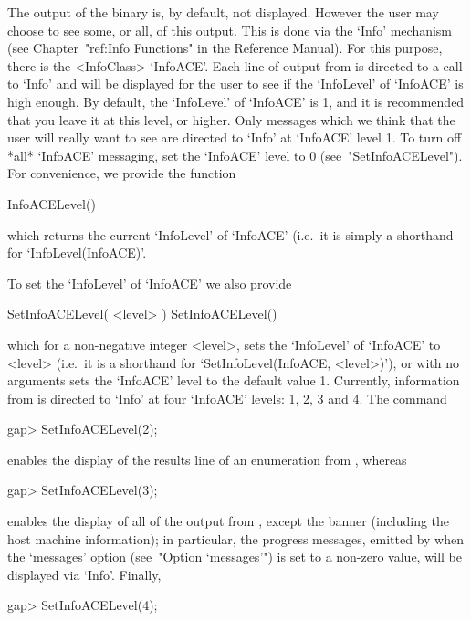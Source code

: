 
\beginitems

The output of the {\ACE} binary is, by default, not displayed. However
the user may choose to see some, or all, of this output. This is  done
via the `Info' mechanism  (see  Chapter~"ref:Info  Functions"  in  the
{\GAP} Reference Manual). For this purpose, there is  the  <InfoClass>
`InfoACE'. Each line of output from {\ACE} is directed to  a  call  to
`Info' and will be displayed for the user to see if the `InfoLevel' of
`InfoACE' is high enough. By default, the `InfoLevel' of `InfoACE'  is
1, and it is recommended that you leave it at this level,  or  higher.
Only messages which we think that the user will really want to see are
directed to `Info' at `InfoACE' level 1. To turn off  *all*  `InfoACE'
messaging, set the `InfoACE' level to 0  (see~"SetInfoACELevel").  For
convenience, we provide the function

\>InfoACELevel()

which returns the current `InfoLevel' of `InfoACE' (i.e.~it is  simply
a shorthand for `InfoLevel(InfoACE)'.

To set the `InfoLevel' of `InfoACE' we also provide

\>SetInfoACELevel( <level> )
\>SetInfoACELevel()

which for a non-negative integer  <level>,  sets  the  `InfoLevel'  of
`InfoACE'    to    <level>    (i.e.~it    is    a    shorthand     for
`SetInfoLevel(InfoACE, <level>)'),  or  with  no  arguments  sets  the
`InfoACE' level to the default value 1.  Currently,  information  from
{\ACE} is directed to `Info' at four `InfoACE' levels: 1, 2, 3 and  4.
The command

\begintt
gap> SetInfoACELevel(2);
\endtt

enables the display of the results line of an enumeration from {\ACE},
whereas

\begintt
gap> SetInfoACELevel(3);
\endtt

enables the display of all of  the  output  from  {\ACE},  except  the
{\ACE} banner (including the host machine information); in particular,
the progress messages, emitted by {\ACE} when  the  `messages'  option
(see~"Option  `messages'")  is  set  to  a  non-zero  value,  will  be
displayed via `Info'. Finally,

\begintt
gap> SetInfoACELevel(4);
\endtt

